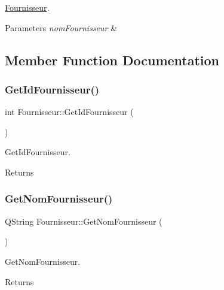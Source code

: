 \mbox{\hyperlink{class_fournisseur}{Fournisseur}}. 


\begin{DoxyParams}{Parameters}
{\em nom\+Fournisseur} & \\
\hline
\end{DoxyParams}


\subsection{Member Function Documentation}
\mbox{\label{class_fournisseur_a72630517bf1b71ffd938bf774f223a56}} 
\subsubsection{\texorpdfstring{Get\+Id\+Fournisseur()}{GetIdFournisseur()}}
{\footnotesize\ttfamily int Fournisseur\+::\+Get\+Id\+Fournisseur (\begin{DoxyParamCaption}{ }\end{DoxyParamCaption})}



Get\+Id\+Fournisseur. 

\begin{DoxyReturn}{Returns}

\end{DoxyReturn}
\mbox{\label{class_fournisseur_aead937b32a22c0a46b3e15afb44333e3}} 
\subsubsection{\texorpdfstring{Get\+Nom\+Fournisseur()}{GetNomFournisseur()}}
{\footnotesize\ttfamily Q\+String Fournisseur\+::\+Get\+Nom\+Fournisseur (\begin{DoxyParamCaption}{ }\end{DoxyParamCaption})}



Get\+Nom\+Fournisseur. 

\begin{DoxyReturn}{Returns}

\end{DoxyReturn}
\mbox{\label{class_fournisseur_a44f6572c550378be4aa21302be6bc58a}} 
